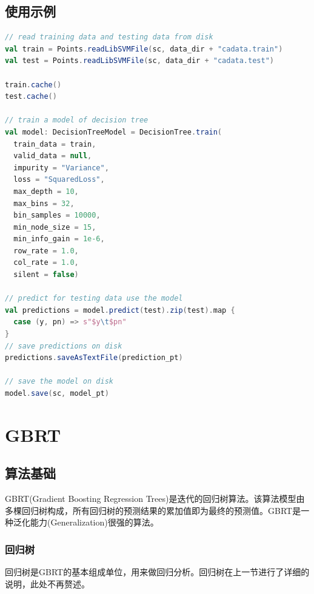 \documentclass[a4paper,11pt,         %
               ]{article}
\begin{document}
\subsection{使用示例}

\begin{lstlisting}[language={SCALA},title={RunDecisionTreeDemo.scala}]  
// read training data and testing data from disk
val train = Points.readLibSVMFile(sc, data_dir + "cadata.train")
val test = Points.readLibSVMFile(sc, data_dir + "cadata.test")

train.cache()
test.cache()

// train a model of decision tree
val model: DecisionTreeModel = DecisionTree.train(
  train_data = train,
  valid_data = null,
  impurity = "Variance",
  loss = "SquaredLoss",
  max_depth = 10,
  max_bins = 32,
  bin_samples = 10000,
  min_node_size = 15,
  min_info_gain = 1e-6,
  row_rate = 1.0,
  col_rate = 1.0,
  silent = false)

// predict for testing data use the model
val predictions = model.predict(test).zip(test).map {
  case (y, pn) => s"$y\t$pn"
}
// save predictions on disk
predictions.saveAsTextFile(prediction_pt)

// save the model on disk
model.save(sc, model_pt)
\end{lstlisting}  

\section{GBRT}

\subsection{算法基础}

GBRT(Gradient Boosting Regression Trees)是迭代的回归树算法。该算法模型由多棵回归树构成，所有回归树的预测结果的累加值即为最终的预测值。GBRT是一种泛化能力(Generalization)很强的算法。

\subsubsection{回归树}

回归树是GBRT的基本组成单位，用来做回归分析。回归树在上一节进行了详细的说明，此处不再赘述。

\end{document}
